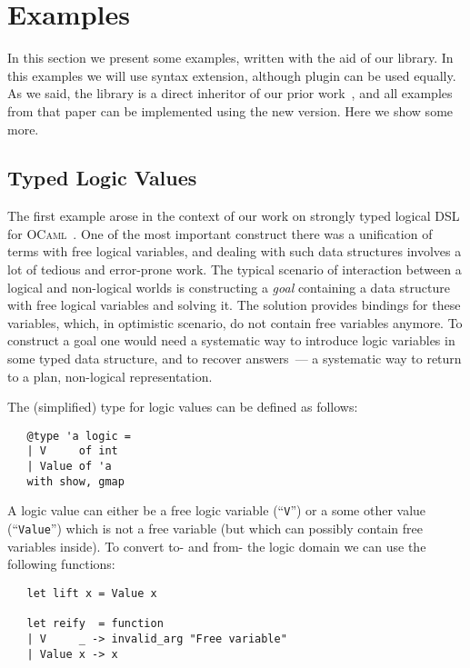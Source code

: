 \section{Examples}

In this section we present some examples, written with the aid of our library. In this examples we will use  syntax extension,
although  plugin can be used equally. As we said, the library is a direct inheritor of our prior work~\cite{TransformationObjects}, and
all examples from that paper can be implemented using the new version. Here we show some more.

\subsection{Typed Logic Values}

The first example arose in the context of our work on strongly typed logical DSL for \textsc{OCaml}~\cite{OCanren}. One of the
most important construct there was a unification of terms with free logical variables, and dealing with such data structures
involves a lot of tedious and error-prone work. The typical scenario of interaction between a logical and non-logical worlds
is constructing a \emph{goal} containing a data structure with free logical variables and solving it. The solution
provides bindings for these variables, which, in optimistic scenario, do not contain free variables anymore. To construct
a goal one would need a systematic way to introduce logic variables in some typed data structure, and to recover answers~---
a systematic way to return to a plan, non-logical representation.

The (simplified) type for logic values can be defined as follows:

\begin{lstlisting}
   @type 'a logic =
   | V     of int
   | Value of 'a
   with show, gmap
\end{lstlisting}

A logic value can either be a free logic variable (``\lstinline{V}'') or a some other value (``\lstinline{Value}'') which is not
a free variable (but which can possibly contain free variables inside). To convert to- and from- the logic domain we can use the following
functions:

\begin{lstlisting}
   let lift x = Value x
  
   let reify  = function
   | V     _ -> invalid_arg "Free variable"
   | Value x -> x
\end{lstlisting}

